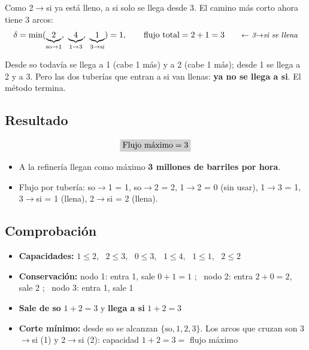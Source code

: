 \documentclass[11pt,a4paper]{article}
\newcommand{\ar}[4][arco]{\draw[#1] (#2) to node[etq, lbl] {#4} (#3);}
\newcommand{\nodosSunco}{%
  \node[fuente]   (so) at (0,-1)   {so};
  \node[nodo]     (n1) at (1.4,0)  {1};
  \node[nodo]     (n2) at (1.4,-2) {2};
  \node[nodo]     (n3) at (2.8,0)  {3};
  \node[sumidero] (si) at (4.2,-1) {si};}
\begin{document}
Como 2$\to$si ya está lleno, a si solo se llega desde 3. El camino más corto ahora tiene 3 arcos:
\[
\delta = \min(\underbrace{2}_{\text{so}\to1},\ \underbrace{4}_{1\to3},\ \underbrace{1}_{3\to\text{si}}) = 1,
\qquad \text{flujo total} = 2 + 1 = 3 \nota{3$\to$si se llena}
\]

\begin{center}
\qquad
{}
\end{center}

Desde so todavía se llega a 1 (cabe 1 más) y a 2 (cabe 1 más); desde 1 se llega a 2 y a 3. Pero las dos
tuberías que entran a si van llenas: \textbf{ya no se llega a si}. El método termina.

\subsection*{Resultado}
\[
\res{\text{Flujo máximo} = 3}
\]
\begin{itemize}[itemsep=2pt]
  \item A la refinería llegan como máximo \textbf{3 millones de barriles por hora}.
  \item Flujo por tubería: so$\to$1 = 1, so$\to$2 = 2, 1$\to$2 = 0 (sin usar), 1$\to$3 = 1, 3$\to$si = 1 (llena),
        2$\to$si = 2 (llena).
\end{itemize}

\subsection*{Comprobación}
\begin{itemize}[itemsep=2pt]
  \item \textbf{Capacidades:} $1 \le 2$, \ $2 \le 3$, \ $0 \le 3$, \ $1 \le 4$, \ $1 \le 1$, \ $2 \le 2$ \checkmark
  \item \textbf{Conservación:} nodo 1: entra 1, sale $0 + 1 = 1$ \checkmark; \ nodo 2: entra $2 + 0 = 2$, sale 2
        \checkmark; \ nodo 3: entra 1, sale 1 \checkmark
  \item \textbf{Sale de so} $1 + 2 = 3$ y \textbf{llega a si} $1 + 2 = 3$ \checkmark
  \item \textbf{Corte mínimo:} desde so se alcanzan $\{\text{so}, 1, 2, 3\}$. Los arcos que cruzan son
        3$\to$si (1) y 2$\to$si (2): capacidad $1 + 2 = 3 =$ flujo máximo \checkmark
\end{itemize}
\end{document}

